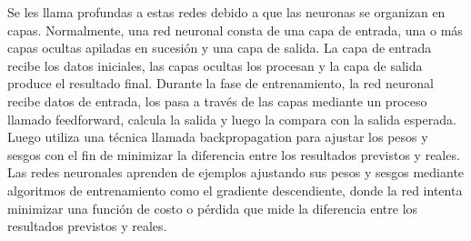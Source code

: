 \documentclass[12pt,letterpaper,final, openany]{scrbook}
\begin{document}
Se les llama profundas a estas redes debido a que las neuronas se organizan en capas. Normalmente, una red neuronal consta de una capa de entrada, una o más capas ocultas apiladas en sucesión y una capa de salida. La capa de entrada recibe los datos iniciales, las capas ocultas los procesan y la capa de salida produce el resultado final. Durante la fase de entrenamiento, la red neuronal recibe datos de entrada, los pasa a través de las capas mediante un proceso llamado feedforward, calcula la salida y luego la compara con la salida esperada. Luego utiliza una técnica llamada backpropagation para ajustar los pesos y sesgos con el fin de minimizar la diferencia entre los resultados previstos y reales. Las redes neuronales aprenden de ejemplos ajustando sus pesos y sesgos mediante algoritmos de entrenamiento como el gradiente descendiente, donde la red intenta minimizar una función de costo o pérdida que mide la diferencia entre los resultados previstos y reales.
\end{document}
